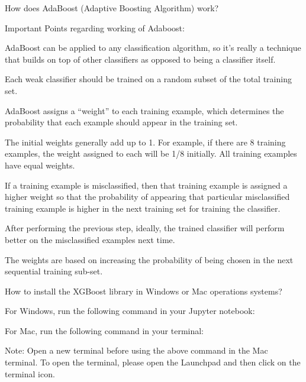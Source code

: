 	\begin{qanda}
		\begin{question}
How does AdaBoost (Adaptive Boosting Algorithm) work?
		\end{question}

		\begin{answer}Important Points regarding working of Adaboost:
			\begin{bulletedlist}
				\item AdaBoost can be applied to any classification algorithm, so it's really a technique that builds on top of other classifiers as opposed to being a classifier itself.
				\item Each weak classifier should be trained on a random subset of the total training set.
				\item AdaBoost assigns a ``weight'' to each training example, which determines the probability that each example should appear in the training set.
				\begin{bulletedlist}
					\item The initial weights generally add up to 1.  For example, if there are 8 training examples, the weight assigned to each will be 1/8 initially.  All training examples have equal weights.
				\end{bulletedlist}
				\item If a training example is misclassified, then that training example is assigned a higher weight so that the probability of appearing that particular misclassified training example is higher in the next training set for training the classifier.
				\item After performing the previous step, ideally, the trained classifier will perform better on the misclassified examples next time.
				\item The weights are based on increasing the probability of being chosen in the next sequential training sub-set.
			\end{bulletedlist}
		\end{answer}
	\end{qanda}\qandqlistfix{}

    \begin{qanda}
		\begin{question}
How to install the XGBoost library in Windows or Mac operations systems?
		\end{question}

		\begin{answer}
For Windows, run the following command in your Jupyter notebook:

\noindent {}

For Mac, run the following command in your terminal:

\noindent {}

Note: Open a new terminal before using the above command in the Mac terminal. To open the terminal, please open the Launchpad and then click on the terminal icon.
		\end{answer}
  \end{qanda}

